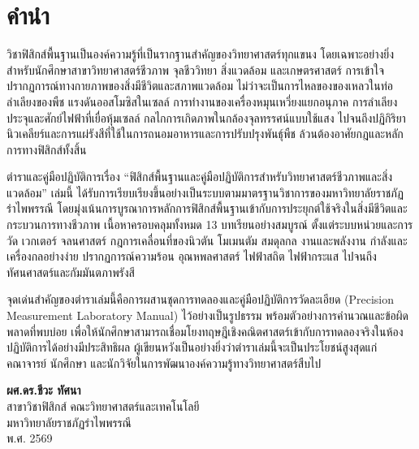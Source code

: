 \chapter*{คำนำ}

วิชาฟิสิกส์พื้นฐานเป็นองค์ความรู้ที่เป็นรากฐานสำคัญของวิทยาศาสตร์ทุกแขนง โดยเฉพาะอย่างยิ่งสำหรับนักศึกษาสาขาวิทยาศาสตร์ชีวภาพ จุลชีววิทยา สิ่งแวดล้อม และเกษตรศาสตร์ การเข้าใจปรากฏการณ์ทางกายภาพของสิ่งมีชีวิตและสภาพแวดล้อม ไม่ว่าจะเป็นการไหลของของเหลวในท่อลำเลียงของพืช แรงดันออสโมซิสในเซลล์ การทำงานของเครื่องหมุนเหวี่ยงแยกอนุภาค การลำเลียงประจุและศักย์ไฟฟ้าที่เยื่อหุ้มเซลล์ กลไกการเกิดภาพในกล้องจุลทรรศน์แบบใช้แสง ไปจนถึงปฏิกิริยานิวเคลียร์และการแผ่รังสีที่ใช้ในการถนอมอาหารและการปรับปรุงพันธุ์พืช ล้วนต้องอาศัยกฎและหลักการทางฟิสิกส์ทั้งสิ้น

ตำราและคู่มือปฏิบัติการเรื่อง ``ฟิสิกส์พื้นฐานและคู่มือปฏิบัติการสำหรับวิทยาศาสตร์ชีวภาพและสิ่งแวดล้อม'' เล่มนี้ ได้รับการเรียบเรียงขึ้นอย่างเป็นระบบตามมาตรฐานวิชาการของมหาวิทยาลัยราชภัฏรำไพพรรณี โดยมุ่งเน้นการบูรณาการหลักการฟิสิกส์พื้นฐานเข้ากับการประยุกต์ใช้จริงในสิ่งมีชีวิตและกระบวนการทางชีวภาพ เนื้อหาครอบคลุมทั้งหมด 13 บทเรียนอย่างสมบูรณ์ ตั้งแต่ระบบหน่วยและการวัด เวกเตอร์ จลนศาสตร์ กฎการเคลื่อนที่ของนิวตัน โมเมนตัม สมดุลกล งานและพลังงาน กำลังและเครื่องกลอย่างง่าย ปรากฏการณ์ความร้อน อุณหพลศาสตร์ ไฟฟ้าสถิต ไฟฟ้ากระแส ไปจนถึงทัศนศาสตร์และกัมมันตภาพรังสี

จุดเด่นสำคัญของตำราเล่มนี้คือการผสานชุดการทดลองและคู่มือปฏิบัติการวัดละเอียด (Precision Measurement Laboratory Manual) ไว้อย่างเป็นรูปธรรม พร้อมตัวอย่างการคำนวณและข้อผิดพลาดที่พบบ่อย เพื่อให้นักศึกษาสามารถเชื่อมโยงทฤษฎีเชิงคณิตศาสตร์เข้ากับการทดลองจริงในห้องปฏิบัติการได้อย่างมีประสิทธิผล ผู้เขียนหวังเป็นอย่างยิ่งว่าตำราเล่มนี้จะเป็นประโยชน์สูงสุดแก่คณาจารย์ นักศึกษา และนักวิจัยในการพัฒนาองค์ความรู้ทางวิทยาศาสตร์สืบไป

\vspace{1.5cm}
\begin{flushright}
    \textbf{ผศ.ดร.ชีวะ ทัศนา}\\[0.2cm]
    สาขาวิชาฟิสิกส์ คณะวิทยาศาสตร์และเทคโนโลยี\\
    มหาวิทยาลัยราชภัฏรำไพพรรณี\\
    พ.ศ. 2569
\end{flushright}

